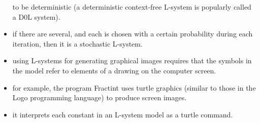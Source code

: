 \documentclass[11pt]{report}
\begin{document}
\begin{itemize}
          to be deterministic (a deterministic context-free L-system is popularly called
          a D0L system).
    \item if there are several, and each is chosen with a certain probability during each
          iteration, then it is a stochastic L-system.
    \item using L-systems for generating graphical images requires that the symbols in
          the model refer to elements of a drawing on the computer screen.
    \item for example, the program Fractint uses turtle graphics (similar to those in the
          Logo programming language) to produce screen images.
    \item it interprets each constant in an L-system model as a turtle command.
\end{itemize}

\clearpage
\printbibliography
\end{document}
